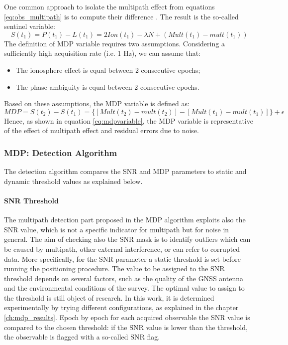 One common approach to isolate the multipath effect from equations \ref{eq:obs_multipath} is to compute their difference \cite{Bisnath:2001}. The result is the so-called sentinel variable:
\begin{equation}
    S(t_{1}) = P(t_{1})-L(t_{1}) = 2Ion(t_{1})- \lambda N + (Mult(t_{1}) - mult(t_{1}))
\label{eq_sentinel}
\end{equation}
The definition of MDP variable requires two assumptions. 
Considering a sufficiently high acquisition rate (i.e. 1 Hz), we can 
assume that:
\begin{itemize}
    \item The ionosphere effect is equal between 2 consecutive epochs;
    \item The phase ambiguity is equal between 2 consecutive epochs.
\end{itemize}
Based on these assumptions, the MDP variable is defined as:
\begin{equation}
    MDP=S(t_{2})-S(t_{1})=\{ [Mult(t_{2})-mult(t_{2})]-[Mult(t_{1})-mult(t_{1})]\}+\epsilon
\label{eq:mdpvariable}
\end{equation}
Hence, as shown in equation \ref{eq:mdpvariable}, the MDP variable is representative of the effect of multipath effect and   
residual errors due to noise.
\subsubsection{MDP: Detection Algorithm}
The detection algorithm compares the SNR and  MDP parameters to
static and dynamic threshold values as explained below.
\paragraph*{SNR Threshold} The multipath detection part proposed in the MDP algorithm exploits also the SNR value, which is not a specific indicator for multipath but for noise in general. The aim of checking also the SNR mask is to identify outliers which can be caused by multipath, other external interference, or can refer to corrupted data.
More specifically, for the SNR parameter 
a static threshold is set before running the positioning procedure. The value to be assigned to the SNR threshold depends on several factors, such as the quality of the GNSS antenna and the environmental conditions of the survey. The optimal value to assign to the threshold is still object of research. In this work, it is determined experimentally by trying different configurations, as explained in the chapter \ref{ch:mdp_results}.
Epoch by epoch for each acquired observable the SNR value is compared to the chosen threshold: if the SNR value is lower than the threshold, the observable is flagged with a so-called SNR flag.
